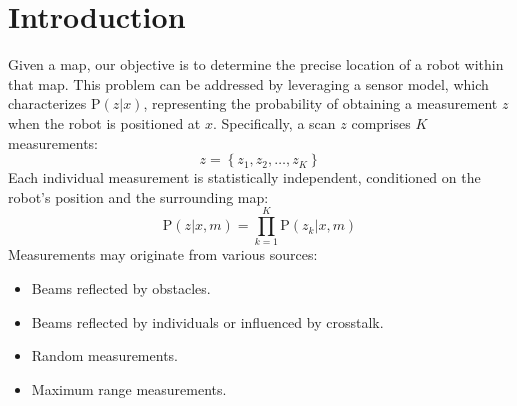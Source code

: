 \section{Introduction}

Given a map, our objective is to determine the precise location of a robot within that map.
This problem can be addressed by leveraging a sensor model, which characterizes $\text{P}(z|x)$, representing the probability of obtaining a measurement $z$ when the robot is positioned at $x$.
Specifically, a scan $z$ comprises $K$ measurements:
\[z=\left\{ z_1,z_2,\dots,z_K \right\}\]
Each individual measurement is statistically independent, conditioned on the robot's position and the surrounding map:
\[\text{P}(z|x,m)=\prod_{k=1}^{K}\text{P}(z_k|x,m)\]
Measurements may originate from various sources:
\begin{itemize}
    \item Beams reflected by obstacles.
    \item Beams reflected by individuals or influenced by crosstalk.
    \item Random measurements.
    \item Maximum range measurements.
\end{itemize}